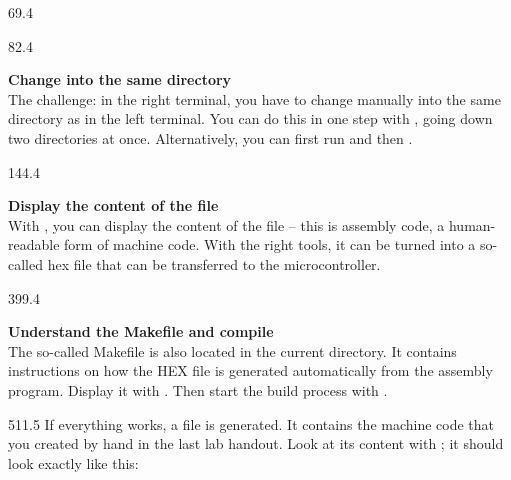 \documentclass{aslab}
\begin{document}
\nextpage
\begin{region}{69.4}
\end{region}

\begin{region}[pitch=12.3]{82.4}
\begin{alphatasks}
\item \textbf{Change into the same directory}\\
  The challenge: in the right terminal, you have to change manually into
  the same directory as in the left terminal. You can do this in one step
  with , going down two directories at once.
  Alternatively, you can first run  and then
  .
\end{alphatasks}
\end{region}

\begin{region}[pitch=12.1]{144.4}
\begin{alphatasks}[start=2]
\item \textbf{Display the content of the file}\\
  With , you can display the content of the file --
  this is assembly code, a human-readable form of machine code. With the
  right tools, it can be turned into a so-called hex file that can be
  transferred to the microcontroller.
\end{alphatasks}
\end{region}


\begin{region}[pitch=12.15]{399.4}
\begin{alphatasks}[start=3]
\item \textbf{Understand the Makefile and compile}\\
  The so-called Makefile is also located in the current directory. It
  contains instructions on how the HEX file is generated automatically from
  the assembly program. Display it with . Then start the
  build process with .
\end{alphatasks}
\end{region}


\begin{region}[x=74.7,right=0,pitch=12.2]{511.5}
If everything works, a file  is generated. It contains
the machine code that you created by hand in the last lab handout. Look at
its content with ; it should look exactly like this:
\end{region}
\end{document}
